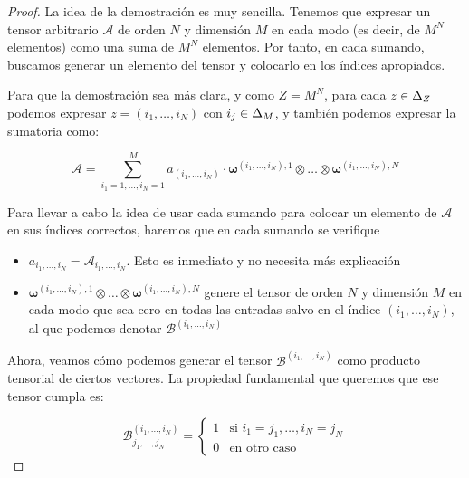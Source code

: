 \begin{proof}
    La idea de la demostración es muy sencilla. Tenemos que expresar un tensor arbitrario $\mathcal{A}$ de orden $N$ y dimensión $M$ en cada modo (es decir, de $M^N$ elementos) como una suma de $M^N$ elementos. Por tanto, en cada sumando, buscamos generar un elemento del tensor y colocarlo en los índices apropiados.

    Para que la demostración sea más clara, y como $Z = M^N$, para cada $z \in \Delta_{Z}$ podemos expresar $z = (i_1, \ldots, i_N)$ con $i_j \in \Delta_{M}$, y también podemos expresar la sumatoria como:

    \begin{equation}
        \mathcal{A} = \sum_{i_1 = 1, \ldots, i_N = 1}^M a_{(i_1, \ldots, i_N)} \cdot \boldsymbol{\omega}^{(i_1, \ldots, i_N), 1} \otimes \ldots \otimes \boldsymbol{\omega}^{(i_1, \ldots, i_N), N}
    \end{equation}

    Para llevar a cabo la idea de usar cada sumando para colocar un elemento de $\mathcal{A}$ en sus índices correctos, haremos que en cada sumando se verifique

    \begin{itemize}
        \item $a_{i_1, \ldots, i_N} = \mathcal{A}_{i_1, \ldots, i_N}$. Esto es inmediato y no necesita más explicación
        \item $\boldsymbol{\omega}^{(i_1, \ldots, i_N), 1} \otimes \ldots \otimes \boldsymbol{\omega}^{(i_1, \ldots, i_N), N}$ genere el tensor de orden $N$ y dimensión $M$ en cada modo que sea cero en todas las entradas salvo en el índice $(i_1, \ldots, i_N)$, al que podemos denotar $\mathcal{B}^{(i_1, \ldots, i_N)}$
    \end{itemize}

    Ahora, veamos cómo podemos generar el tensor $\mathcal{B}^{(i_1, \ldots, i_N)}$ como producto tensorial de ciertos vectores. La propiedad fundamental que queremos que ese tensor cumpla es:

    \begin{equation}
        \mathcal{B}^{(i_1, \ldots, i_N)}_{j_1, \ldots, j_N} =
        \begin{cases}
            1 & \text{si } i_1 = j_1, \ldots, i_N = j_N \\
            0 & \text{en otro caso}
        \end{cases}
    \end{equation}


\end{proof}
